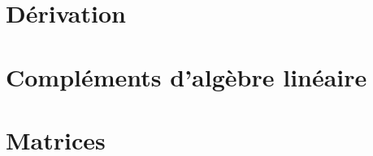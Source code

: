 \documentclass[13pt, twoside, a4paper, french]{report}
\begin{document}
    \chapter{Dérivation}\label{ch:derivation}
        


    \chapter{Compléments d'algèbre linéaire}\label{ch:complements-d-algebre-lineaire}
        


    \chapter{Matrices}\label{ch:matrices}
        
\end{document}
